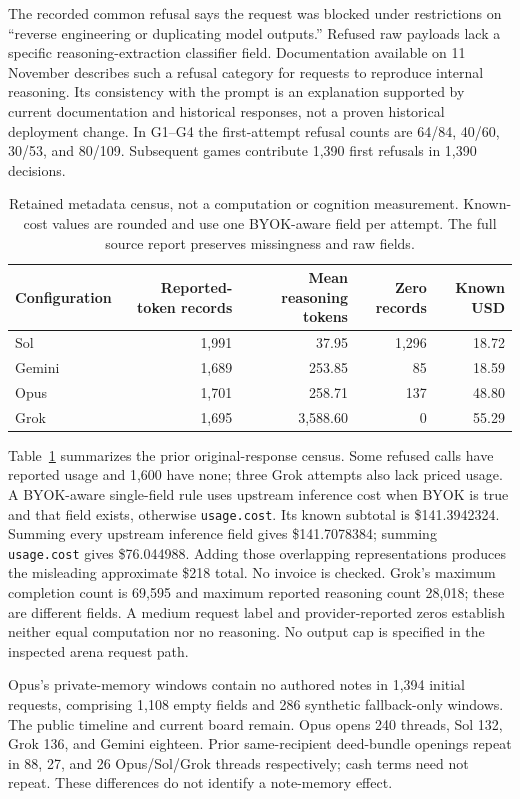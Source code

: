 The recorded common refusal says the request was blocked under restrictions on ``reverse engineering or duplicating model outputs.'' Refused raw payloads lack a specific reasoning-extraction classifier field. Documentation available on 11 November describes such a refusal category for requests to reproduce internal reasoning. Its consistency with the prompt is an explanation supported by current documentation and historical responses, not a proven historical deployment change. In G1--G4 the first-attempt refusal counts are 64/84, 40/60, 30/53, and 80/109. Subsequent games contribute 1,390 first refusals in 1,390 decisions.

\begin{table}[htbp]\centering\small
\begin{tabular}{@{}lrrrr@{}}\toprule
Configuration & Reported-token records & Mean reasoning tokens & Zero records & Known USD\\\midrule
Sol & 1,991 & 37.95 & 1,296 & 18.72\\
Gemini & 1,689 & 253.85 & 85 & 18.59\\
Opus & 1,701 & 258.71 & 137 & 48.80\\
Grok & 1,695 & 3,588.60 & 0 & 55.29\\\bottomrule
\end{tabular}
\caption{Retained metadata census, not a computation or cognition measurement. Known-cost values are rounded and use one BYOK-aware field per attempt. The full source report preserves missingness and raw fields.}
\label{tab:cost}
\end{table}

Table~\ref{tab:cost} summarizes the prior original-response census. Some refused calls have reported usage and 1,600 have none; three Grok attempts also lack priced usage. A BYOK-aware single-field rule uses upstream inference cost when BYOK is true and that field exists, otherwise \texttt{usage.cost}. Its known subtotal is \$141.3942324. Summing every upstream inference field gives \$141.7078384; summing \texttt{usage.cost} gives \$76.044988. Adding those overlapping representations produces the misleading approximate \$218 total. No invoice is checked. Grok's maximum completion count is 69,595 and maximum reported reasoning count 28,018; these are different fields. A medium request label and provider-reported zeros establish neither equal computation nor no reasoning. No output cap is specified in the inspected arena request path.

Opus's private-memory windows contain no authored notes in 1,394 initial requests, comprising 1,108 empty fields and 286 synthetic fallback-only windows. The public timeline and current board remain. Opus opens 240 threads, Sol 132, Grok 136, and Gemini eighteen. Prior same-recipient deed-bundle openings repeat in 88, 27, and 26 Opus/Sol/Grok threads respectively; cash terms need not repeat. These differences do not identify a note-memory effect.

